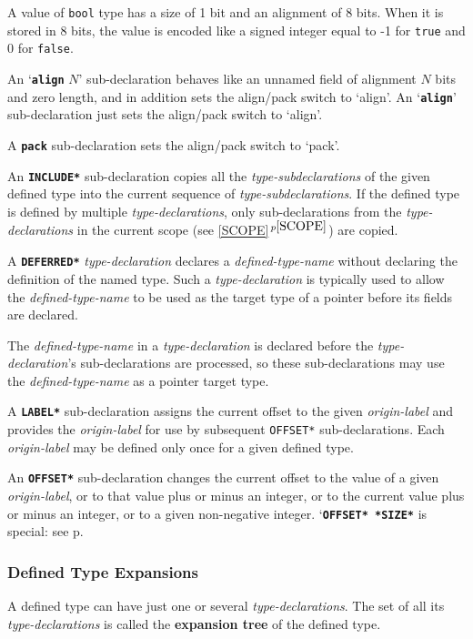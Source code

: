 \documentclass[12pt]{article}
\newcommand{\key}[1]{{\rm \bfseries #1}}
\newcommand{\ttkey}[1]{{\tt \bfseries #1}}
\newcommand{\itemref}[1]{\ref{#1}$\,^{p\pageref{#1}}$}
\newcommand{\pagref}[1]{p\pageref{#1}}
\begin{document}
A value of {\tt bool} type has a size of 1 bit and an alignment
of 8 bits.  When it is stored in 8 bits, the value is encoded
like a signed integer equal to -1 for {\tt true} and 0 for {\tt false}.

An `\ttkey{align} $N$' sub-declaration behaves like an unnamed
field of alignment $N$ bits and zero length,
and in addition sets the align/pack switch to `align'.
An `\ttkey{align}' sub-declaration just sets the
align/pack switch to `align'.

A \ttkey{pack} sub-declaration sets the align/pack switch to `pack'.

An \ttkey{*INCLUDE*} sub-declaration copies all the {\em type-subdeclarations}
of the given defined type into the current sequence of
{\em type-subdeclarations}.
If the defined type is
defined by multiple {\em type-declarations}, only sub-declarations
from the {\em type-declarations} in the current scope (see \itemref{SCOPE})
are copied.

A \ttkey{*DEFERRED*} {\em type-declaration} declares a {\em defined-type-name}
without declaring the definition of the named type.
Such a {\em type-declaration} is typically used to allow the
{\em defined-type-name}
to be used as the target type of a pointer before its fields are declared.

The {\em defined-type-name} in a {\em type-declaration} is declared before
the {\em type-declaration}'s sub-declarations are processed, so these
sub-declarations may use the {\em defined-type-name} as a pointer target type.

A \ttkey{*LABEL*} sub-declaration assigns the current offset to the
given {\em origin-label} and provides the {\em origin-label}
for use by subsequent {\tt *OFFSET*} sub-declarations.
Each {\em origin-label} may be defined only once for a given
defined type.

An \ttkey{*OFFSET*} sub-declaration changes the current offset to the value
of a given {\em origin-label}, or to that value plus or minus
an integer, or to the current value plus or minus an integer,
or to a given non-negative integer.
`\ttkey{*OFFSET* *SIZE*} is special: see \pagref{OFFSET-SIZE}.

\subsubsection{Defined Type Expansions }
\label{DEFINED-TYPE-EXPANSIONS}

A defined type can have just one or several {\em type-declara\-tions}.
The set of all its {\em type-declarations} is called the
\key{expansion tree} of the defined type.
\end{document}
